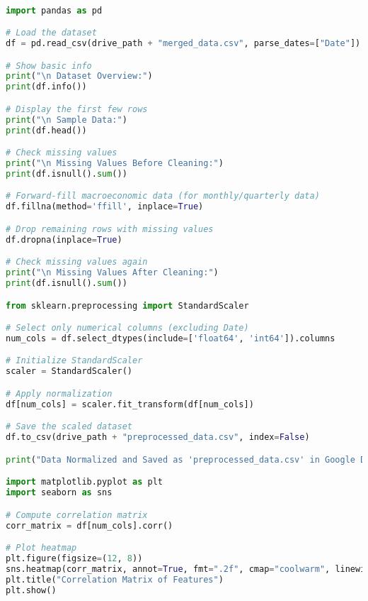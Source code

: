 \begin{lstlisting}[language=Python, caption=Preprocessing]

import pandas as pd

# Load the dataset
df = pd.read_csv(drive_path + "merged_data.csv", parse_dates=["Date"])

# Show basic info
print("\n Dataset Overview:")
print(df.info())

# Display the first few rows
print("\n Sample Data:")
print(df.head())

# Check missing values
print("\n Missing Values Before Cleaning:")
print(df.isnull().sum())

# Forward-fill macroeconomic data (for monthly/quarterly data)
df.fillna(method='ffill', inplace=True)

# Drop remaining rows with missing values
df.dropna(inplace=True)

# Check missing values again
print("\n Missing Values After Cleaning:")
print(df.isnull().sum())

from sklearn.preprocessing import StandardScaler

# Select only numerical columns (excluding Date)
num_cols = df.select_dtypes(include=['float64', 'int64']).columns

# Initialize StandardScaler
scaler = StandardScaler()

# Apply normalization
df[num_cols] = scaler.fit_transform(df[num_cols])

# Save the scaled dataset
df.to_csv(drive_path + "preprocessed_data.csv", index=False)

print("Data Normalized and Saved as 'preprocessed_data.csv' in Google Drive!")

import matplotlib.pyplot as plt
import seaborn as sns

# Compute correlation matrix
corr_matrix = df[num_cols].corr()

# Plot heatmap
plt.figure(figsize=(12, 8))
sns.heatmap(corr_matrix, annot=True, fmt=".2f", cmap="coolwarm", linewidths=0.5)
plt.title("Correlation Matrix of Features")
plt.show()

\end{lstlisting}